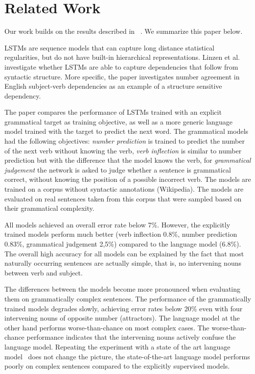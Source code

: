 \section{Related Work}
\label{related work}

Our work builds on the results described in ~\citep{Linzen2016}.  
We summarize this paper below.

LSTMs are sequence models that can capture long distance statistical regularities,
but do not have built-in hierarchical representations.
Linzen et al. investigate whether LSTMs are able to capture
dependencies that follow from syntactic structure. More specific,
the paper investigates number agreement in English subject-verb dependencies
as an example of a structure sensitive dependency.

The paper compares the performance of LSTMs
trained with an explicit grammatical target as training objective,
as well as a more generic language model trained with the target to
predict the next word. 
The grammatical models had the following objectives:
\textit{number prediction} is trained to predict the 
number of the next verb without knowing the verb,
\textit{verb inflection} is similar to number prediction
but with the difference that the model knows the verb,
for \textit{grammatical judgement} the network is asked
to judge whether a sentence is grammatical correct, 
without knowing the position of a possible incorrect
verb.
The models are trained on a corpus without syntactic annotations (Wikipedia).
The models are evaluated on real sentences taken from this corpus
that were sampled based on their grammatical complexity. 
  
All models achieved an overall error rate below 7\%. However,
the explicitly trained models perform much better 
(verb inflection 0.8\%, number prediction 0.83\%, grammatical judgement 2,5\%)
compared to the language model (6.8\%). 
The overall high accuracy for all models can be explained by
the fact that most naturally occurring sentences are actually
simple, that is, no intervening nouns between verb and subject.

The differences between the models become more pronounced
when evaluating them on grammatically complex sentences.
The performance of the grammatically trained models
degrades slowly, achieving error rates below 20\% even with
four intervening nouns of opposite number (attractors).
The language model at the other hand performs worse-than-chance
on most complex cases. The worse-than-chance performance
indicates that the intervening nouns actively confuse
the language model. Repeating the experiment with a
state of the art language model~\citep{Jozefowicz2016} does not
change the picture, the state-of-the-art language model 
performs poorly on complex sentences 
compared to the explicitly supervised models.



